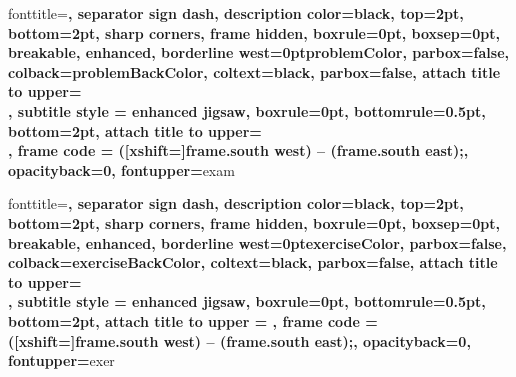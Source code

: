     {\begin{tcbexamples}{#1}{#2}}{\end{tcbexamples}}
    {\begin{tcbexamples}{#1}{#2}\vspace*{-15pt}\begin{itemize}}{\end{itemize}\end{tcbexamples}}
%
     {fonttitle=\sffamily\bfseries\color{black},
      separator sign dash, description color=black,
      top=2pt, bottom=2pt,
      sharp corners,
      frame hidden, boxrule=0pt, boxsep=0pt, breakable,
      enhanced, borderline west={\the\tcbBorderWidth}{0pt}{problemColor},
      parbox=false,
      colback=problemBackColor,
      coltext=black,
      parbox=false,
      attach title to upper={\\},
      subtitle style = {enhanced jigsaw, boxrule=0pt, bottomrule=0.5pt, bottom=2pt,
      attach title to upper={\\},
      frame code = { ([xshift=\the\tcbBorderWidth]frame.south west) -- (frame.south east);}, 
      opacityback=0, fontupper=\color{black}}}{exam}
    {\begin{tcbproblem}{#1}{#2}}{\end{tcbproblem}}
%
    {fonttitle=\sffamily\bfseries\color{black},
        separator sign dash, description color=black,
        top=2pt, bottom=2pt,
        sharp corners,
        frame hidden, boxrule=0pt, boxsep=0pt, breakable,
        enhanced, borderline west={\the\tcbBorderWidth}{0pt}{exerciseColor},
        parbox=false,
        colback=exerciseBackColor,
        coltext=black,
        parbox=false,
        attach title to upper={\\},
        subtitle style = {enhanced jigsaw, boxrule=0pt, bottomrule=0.5pt, bottom=2pt,
        attach title to upper = {},
        frame code = { ([xshift=\the\tcbBorderWidth]frame.south west) -- (frame.south east);},
opacityback=0, fontupper=\color{black}}}{exer}
    {\begin{tcbexercise}{#1}{#2}}{\end{tcbexercise}}

